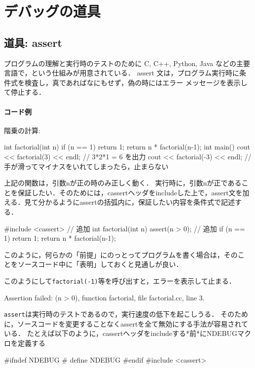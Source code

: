 \section{デバッグの道具}

\subsection{道具: assert}

プログラムの理解と実行時のテストのために C, C++, Python, Java などの主要言語で，という仕組みが用意されている．
assert 文は，プログラム実行時に条件式を検査し，真であればなにもせず，偽の時にはエラー
メッセージを表示して停止する．

\paragraph{コード例}
階乗の計算:
\begin{cbox}[emph={factorial}]
int factorial(int n) {
  if (n == 1)
    return 1;
  return n * factorial(n-1);
}
int main() {
  cout << factorial(3) << endl; // 3*2*1 = 6 を出力
  cout << factorial(-3) << endl; // 手が滑ってマイナスをいれてしまったら，止まらない
}
\end{cbox}

上記の関数は，引数nが正の時のみ正しく動く．
実行時に，引数nが正であることを保証したい．そのためには，cassertヘッダをincludeした上で，assert文を加える．見て分かるようにassertの括弧内に，保証したい内容を条件式で記述する．
\begin{cbox}[emph={cassert,assert}]
#include <cassert> // 追加
int factorial(int n) {
  assert(n > 0); // 追加
  if (n == 1)
    return 1;
  return n * factorial(n-1);
}
\end{cbox}

このように，何らかの「前提」にのっとってプログラムを書く場合は，そのこ
とをソースコード中に「表明」しておくと見通しが良い．

このようにして\texttt{factorial(-1)}等を呼び出すと，エラーを表示して止まる．

\begin{terminal}
Assertion failed: (n > 0), function factorial, file factorial.cc, line 3.
\end{terminal}

\texttt{assert}は実行時のテストであるので，実行速度の低下を起こしうる．
そのために，ソースコードを変更することなくassertを全て無効にする手法が容易されている．
たとえば以下のように，cassertヘッダをincludeする*前*にNDEBUGマクロを定義する
\begin{cbox}[emph={NDEBUG}]
#ifndef NDEBUG
#  define NDEBUG
#endif
#include <cassert>
\end{cbox}

